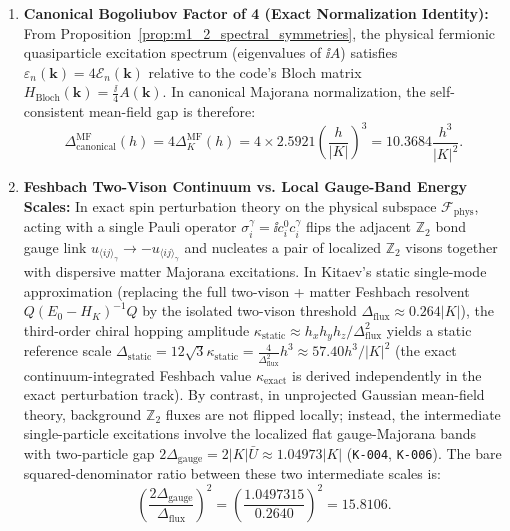 \begin{enumerate}
\item \textbf{Canonical Bogoliubov Factor of 4 (Exact Normalization Identity):} From Proposition~\ref{prop:m1_2_spectral_symmetries}, the physical fermionic quasiparticle excitation spectrum (eigenvalues of $\ii A$) satisfies $\varepsilon_n(\mathbf{k}) = 4\mathcal{E}_n(\mathbf{k})$ relative to the code's Bloch matrix $H_{\mathrm{Bloch}}(\mathbf{k}) = \frac{\ii}{4}A(\mathbf{k})$. In canonical Majorana normalization, the self-consistent mean-field gap is therefore:
\begin{equation}
\label{eq:m1_6_canonical_mf_gap}
\Delta_{\mathrm{canonical}}^{\mathrm{MF}}(h) = 4 \Delta_K^{\mathrm{MF}}(h) = 4 \times 2.5921 \left(\frac{h}{|K|}\right)^3 = 10.3684 \frac{h^3}{|K|^2}.
\end{equation}
\item \textbf{Feshbach Two-Vison Continuum vs. Local Gauge-Band Energy Scales:} In exact spin perturbation theory on the physical subspace $\mathcal{F}_{\mathrm{phys}}$, acting with a single Pauli operator $\sigma_i^\gamma = \ii c_i^0 c_i^\gamma$ flips the adjacent $\mathbb{Z}_2$ bond gauge link $u_{\langle ij\rangle_\gamma} \to -u_{\langle ij\rangle_\gamma}$ and nucleates a pair of localized $\mathbb{Z}_2$ visons together with dispersive matter Majorana excitations. In Kitaev's static single-mode approximation (replacing the full two-vison + matter Feshbach resolvent $Q(E_0 - H_K)^{-1}Q$ by the isolated two-vison threshold $\Delta_{\mathrm{flux}} \approx 0.264 |K|$), the third-order chiral hopping amplitude $\kappa_{\mathrm{static}} \approx h_x h_y h_z / \Delta_{\mathrm{flux}}^2$ yields a static reference scale $\Delta_{\mathrm{static}} = 12\sqrt{3}\kappa_{\mathrm{static}} = \frac{4}{\Delta_{\mathrm{flux}}^2} h^3 \approx 57.40 h^3/|K|^2$ (the exact continuum-integrated Feshbach value $\kappa_{\mathrm{exact}}$ is derived independently in the exact perturbation track). By contrast, in unprojected Gaussian mean-field theory, background $\mathbb{Z}_2$ fluxes are not flipped locally; instead, the intermediate single-particle excitations involve the localized flat gauge-Majorana bands with two-particle gap $2\Delta_{\mathrm{gauge}} = 2|K|\bar{U} \approx 1.04973 |K|$ (\texttt{K-004}, \texttt{K-006}). The bare squared-denominator ratio between these two intermediate scales is:
\begin{equation}
\label{eq:m1_6_denominator_ratio}
\left(\frac{2\Delta_{\mathrm{gauge}}}{\Delta_{\mathrm{flux}}}\right)^2 = \left(\frac{1.0497315}{0.2640}\right)^2 = 15.8106.

\end{equation}
\end{enumerate}
